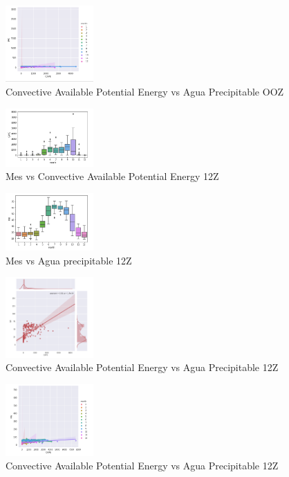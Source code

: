 \documentclass[a4paper]{article}
\begin{document}
\begin{figure}[h]
\centering
\includegraphics[width=0.3\textwidth]{4.png}
\caption{\label{fig:}Convective Available Potential Energy vs Agua Precipitable OOZ}
\end{figure}


\begin{figure}[h]
\centering
\includegraphics[width=0.3\textwidth]{5.png}
\caption{\label{fig:}Mes vs Convective Available Potential Energy 12Z}
\end{figure}

\begin{figure}[h]
\centering
\includegraphics[width=0.3\textwidth]{6.png}
\caption{\label{fig:}Mes vs Agua precipitable 12Z}
\end{figure}

\begin{figure}[h]
\centering
\includegraphics[width=0.3\textwidth]{7.png}
\caption{\label{fig:}Convective Available Potential Energy vs Agua Precipitable 12Z}
\end{figure}

\begin{figure}[h]
\centering
\includegraphics[width=0.3\textwidth]{8.png}
\caption{\label{fig:}Convective Available Potential Energy vs Agua Precipitable 12Z}
\end{figure}
\end{document}
